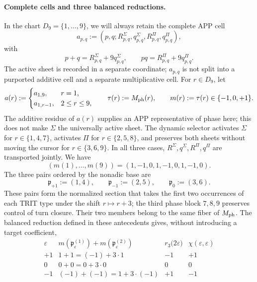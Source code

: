 \paragraph{Complete cells and three balanced reductions.}
In the chart \(D_9=\{1,\ldots,9\}\), we will always retain the complete APP
cell
\[
 a_{p,q}:=(p,q;R^\Sigma_{p,q},q^\Sigma_{p,q},
                 R^\Pi_{p,q},q^\Pi_{p,q}),
\]
with
\[
 p+q=R^\Sigma_{p,q}+9q^\Sigma_{p,q},\qquad
 pq=R^\Pi_{p,q}+9q^\Pi_{p,q}.
\]
The active sheet is recorded in a separate coordinate; \(a_{p,q}\) is not
split into a purported additive cell and a separate multiplicative cell. For
\(r\in D_9\), let
\begin{equation}
 a(r):=
 \begin{cases}
  a_{1,9},&r=1,\\
  a_{1,r-1},&2\le r\le9,
 \end{cases}
 \qquad
 \tau(r):=M_{\rm ph}(r),
 \qquad
 m(r):=\tau(r)\in\{-1,0,+1\}.
 \label{hmtfg:eq:celula-completa-fase-ch}
\end{equation}
The additive residue of \(a(r)\) supplies an APP representative of phase
here; this does not make \(\Sigma\) the universally active sheet. The dynamic
selector activates \(\Sigma\) for \(r\in\{1,4,7\}\), activates \(\Pi\) for
\(r\in\{2,5,8\}\), and preserves both sheets without moving the cursor for
\(r\in\{3,6,9\}\). In all three cases,
\(R^\Sigma,q^\Sigma,R^\Pi,q^\Pi\) are transported jointly. We have
\[
 (m(1),\ldots,m(9))=(1,-1,0,1,-1,0,1,-1,0).
\]
The three pairs ordered by the nonadic base are
\begin{equation}
 \mathfrak p_{+1}:=(1,4),\qquad
 \mathfrak p_{-1}:=(2,5),\qquad
 \mathfrak p_{0}:=(3,6).
 \label{hmtfg:eq:tres-pares-internos-ch}
\end{equation}
These pairs form the normalized section that takes the first two occurrences of each TRIT type under the shift \(r\mapsto r+3\); the third phase block \(7,8,9\) preserves control of turn closure. Their two members belong to the same fiber of \(M_{\rm ph}\). The balanced reduction defined in these antecedents gives, without introducing a target coefficient,
\begin{equation}
 \begin{array}{c|c|c|c}
 \varepsilon&m(\mathfrak p_\varepsilon^{(1)})
                  +m(\mathfrak p_\varepsilon^{(2)})
   &r_3\bigl(2\varepsilon\bigr)&
   \chi(\varepsilon,\varepsilon)\\ \hline
 +1&1+1=(-1)+3\cdot1&-1&+1\\
 0&0+0=0+3\cdot0&0&0\\
 -1&(-1)+(-1)=1+3\cdot(-1)&+1&-1
 \end{array}
 \label{hmtfg:eq:tres-carry-derivados-ch}
\end{equation}
